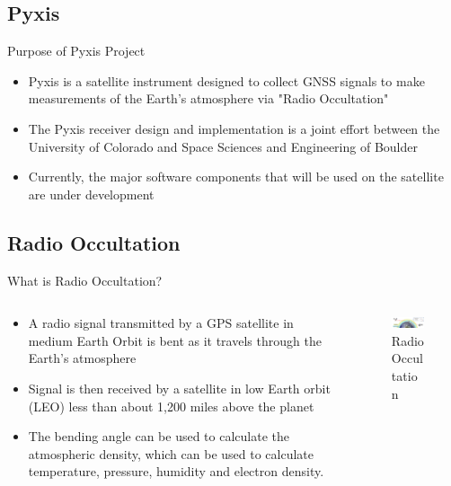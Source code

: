\documentclass[10pt,aspectratio=169]{beamer}
\begin{document}
\subsection{Pyxis}
    \begin{frame}{Purpose of Pyxis Project}
        \begin{itemize}
            \item Pyxis is a satellite instrument designed to collect GNSS signals to make measurements of the Earth's atmosphere via "Radio Occultation"
            \item The Pyxis receiver design and implementation is a joint effort between the University of Colorado and Space Sciences and Engineering of Boulder
            \item Currently, the major software components that will be used on the satellite are under development
        \end{itemize}
    \end{frame}

\subsection{Radio Occultation}
\begin{frame}{What is Radio Occultation?}
    \begin{columns}
        \begin{column}{0.6\textwidth}
            \begin{itemize}
                \item A radio signal transmitted by a GPS satellite in medium Earth Orbit is bent as it travels through the Earth's atmosphere
                \item Signal is then received by a satellite in low Earth orbit (LEO) less than about 1,200 miles above the planet
                \item The bending angle can be used to calculate the atmospheric density, which can be used to calculate temperature, pressure, humidity and electron density.\cite{planetiQ:2016}
            \end{itemize}
        \end{column}
        \begin{column}{0.4\textwidth}
            \begin{figure}
                \centering
                \includegraphics[width=6cm]{ro}
                \caption{Radio Occultation\cite{planetiQ:2016}}
            \end{figure}
            \end{column}
    \end{columns}
\end{frame}
\end{document}

